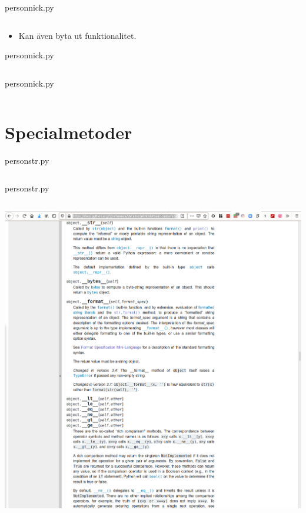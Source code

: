 \begin{frame}[fragile]
  person\textunderscore nick.py \hrulefill
  \inputminted[linenos,lastline=17]{python}{examples/person_nick.py}
\end{frame}

\begin{frame}[fragile]
  \begin{remark}
    \begin{itemize}
      \item Kan även byta ut funktionalitet.
    \end{itemize}
  \end{remark}
  person\textunderscore nick.py \hrulefill
  \inputminted[linenos,firstline=19,lastline=27]{python}{examples/person_nick.py}
\end{frame}

\begin{frame}[fragile]
  person\textunderscore nick.py \hrulefill
  \inputminted[linenos,firstline=30]{python}{examples/person_nick.py}
\end{frame}


\section{Specialmetoder}

\begin{frame}[fragile]
  person\textunderscore str.py \hrulefill
  \inputminted[linenos,lastline=8]{python}{examples/person_str.py}
\end{frame}

\begin{frame}[fragile]
  person\textunderscore str.py \hrulefill
  \inputminted[linenos,firstline=11]{python}{examples/person_str.py}
\end{frame}

\begin{frame}
  \includegraphics[width=\columnwidth]{figs/docs-special-methods.png}
\end{frame}
